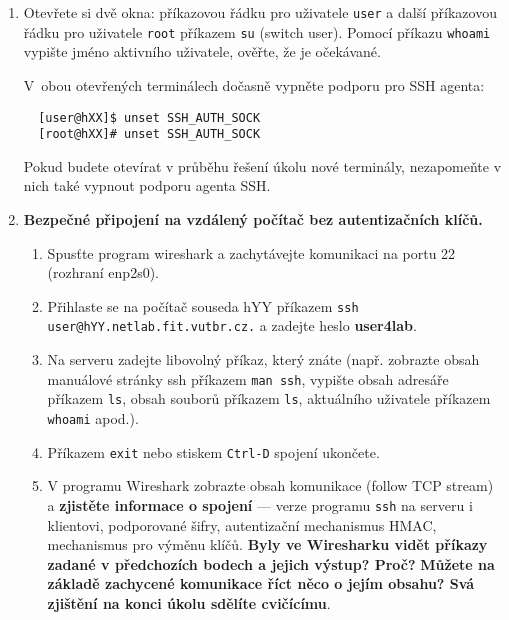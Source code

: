 \documentclass[a4paper,11pt]{article}
\begin{document}
\begin{enumerate}

  \item Otevřete si dvě okna: příkazovou řádku pro uživatele {\tt user} a další
    příkazovou řádku pro uživatele {\tt root} příkazem {\tt su} (switch user).
Pomocí příkazu {\tt whoami} vypište jméno aktivního uživatele, ověřte, že je
    očekávané.

    V~obou otevřených terminálech dočasně vypněte podporu pro SSH agenta:
  \begin{lstlisting}
  [user@hXX]$ unset SSH_AUTH_SOCK
  [root@hXX]# unset SSH_AUTH_SOCK
  \end{lstlisting}

  Pokud budete otevírat v průběhu řešení úkolu nové terminály, nezapomeňte
  v nich také vypnout podporu agenta SSH.

  \item {\bf Bezpečné připojení na vzdálený počítač bez autentizačních klíčů.}

    \begin{enumerate}

      \item Spusťte program wireshark a zachytávejte komunikaci na portu 22
        (rozhraní enp2s0).

      \item Přihlaste se na počítač souseda hYY příkazem {\tt ssh user@hYY.netlab.fit.vutbr.cz.} a zadejte heslo \textbf{user4lab}.

      \item Na serveru zadejte libovolný příkaz, který znáte (např. zobrazte
        obsah manuálové stránky ssh příkazem {\tt man ssh}, vypište
        obsah adresáře příkazem {\tt ls}, obsah souborů příkazem {\tt ls},
        aktuálního uživatele příkazem {\tt whoami} apod.).

      \item Příkazem {\tt exit} nebo stiskem {\tt Ctrl-D} spojení ukončete.

      \item V programu Wireshark zobrazte obsah komunikace (follow TCP stream) a
        {\bf zjistěte informace o spojení} --- verze programu {\tt ssh} na serveru i
        klientovi, podporované šifry, autentizační mechanismus HMAC, mechanismus
        pro výměnu klíčů.
        {\bf Byly ve Wiresharku vidět příkazy zadané v předchozích bodech a jejich výstup? Proč?}
	{\bf Můžete na základě zachycené
        komunikace říct něco o jejím obsahu? Svá zjištění na konci úkolu sdělíte cvičícímu}.


\end{enumerate}
\end{enumerate}
\end{document}
